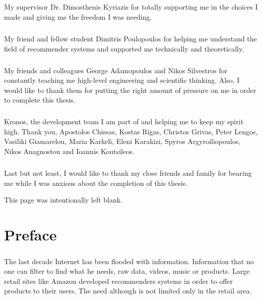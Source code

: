 \documentclass[12pt, a4paper, oneside, greek]{report}
\begin{document}
	\paragraph{} My supervisor Dr. Dimosthenis Kyriazis for totally supporting me in the choices I made and giving me the freedom I was needing.
	
	\paragraph{} My friend and fellow student Dimitris Poulopoulos for helping me understand the field of recommender systems and supported me technically and theoretically.
	
	\paragraph{} My friends and colleagues George Adamopoulos and Nikos Silvestros for constantly teaching me high-level engineering and scientific thinking. Also, I would like to thank them for putting the right amount of pressure on me in order to complete this thesis.
	
	\paragraph{} Kronos, the development team I am part of and helping me to keep my spirit high. Thank you, Apostolos Chissas, Kostas Rigas, Christos Grivas, Peter Lengos, Vasiliki Giamarelou, Maria Karkeli, Eleni Karakizi, Spyros Argyroiliopoulos, Nikos Anagnostou and Ioannis Koutsileos. 
	
	\paragraph{} Last but not least, I would like to thank my close friends and family for bearing me while I was anxious about the completion of this thesis.
	
	\newpage
	\begin{center}
		This page was intentionally left blank.
	\end{center}
	\newpage
	\chapter*{Preface}
	\paragraph{} The last decade Internet has been flooded with information. Information that no one can filter to find what he needs, raw data, videos, music or products. Large retail sites like Amazon developed recommenders systems in order to offer products to their users. The need although is not limited only in the retail area. 
\end{document}
